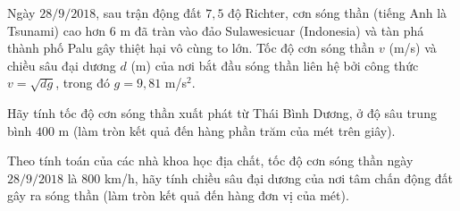 \begin{bt}%
	Ngày $28 / 9 / 2018$, sau trận động đất $7{,}5$ độ Richter, cơn sóng thần (tiếng Anh là Tsunami) cao hơn $6$ m đã tràn vào đảo Sulawesicuar (Indonesia) và tàn phá thành phố Palu gây thiệt hại vô cùng to lớn. Tốc độ cơn sóng thần $v$ (m/s) và chiều sâu đại dương $d$ (m) của nơi bắt đầu sóng thần liên hệ bởi công thức $v=\sqrt{d g}$, trong đó $g=9{,}81$ m/s$^2$.
	\begin{listEX}
	\item Hãy tính tốc độ cơn sóng thần xuất phát từ Thái Bình Dương, ở độ sâu trung bình $400$ m (làm tròn kết quả đến hàng phần trăm của mét trên giây).
	\item Theo tính toán của các nhà khoa học địa chất, tốc độ cơn sóng thần ngày $28/9/2018$ là $800$ km/h, hãy tính chiều sâu đại dương của nơi tâm chấn động đất gây ra sóng thần (làm tròn kết quả đến hàng đơn vị của mét).
	\end{listEX}
\end{bt}
